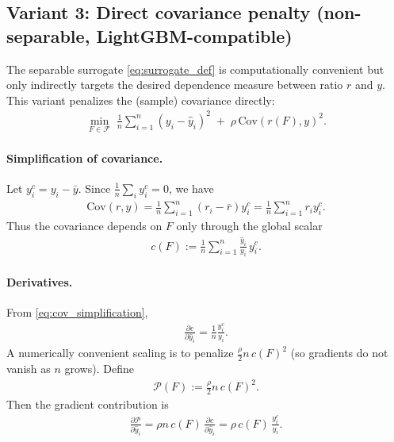 \documentclass[11pt]{article}
\theoremstyle{plain}
\theoremstyle{definition}
\newcommand{\1}{\mathbf{1}}
\begin{document}
\subsection{Variant 3: Direct covariance penalty (non-separable, LightGBM-compatible)}
\label{subsec:direct_cov}

The separable surrogate \eqref{eq:surrogate_def} is computationally convenient but only indirectly targets the desired dependence measure between ratio $r$ and $y$. This variant penalizes the (sample) covariance directly:
\begin{align}
\min_{F\in\mathcal{F}}\; \frac{1}{n}\sum_{i=1}^n (y_i-\hat y_i)^2 
\; +\; \rho\, \mathrm{Cov}(r(F),y)^2.
\label{eq:direct_cov_objective}
\end{align}

\paragraph{Simplification of covariance.}
Let $y^c_i=y_i-\bar y$. Since $\frac{1}{n}\sum_i y_i^c=0$, we have
\begin{align}
\mathrm{Cov}(r,y)
= \frac{1}{n}\sum_{i=1}^n (r_i-\bar r) y_i^c
= \frac{1}{n}\sum_{i=1}^n r_i y_i^c.
\label{eq:cov_simplification}
\end{align}
Thus the covariance depends on $F$ only through the global scalar
\begin{align}
 c(F) := \frac{1}{n}\sum_{i=1}^n \frac{\hat y_i}{y_i}\, y_i^c.
\end{align}

\paragraph{Derivatives.}
From \eqref{eq:cov_simplification},
\begin{align}
\frac{\partial c}{\partial \hat y_i}
= \frac{1}{n}\frac{y_i^c}{y_i}.
\label{eq:dc_dyhat}
\end{align}
A numerically convenient scaling is to penalize $\tfrac{\rho}{2}n\,c(F)^2$ (so gradients do not vanish as $n$ grows). Define
\begin{align}
\mathcal{P}(F) := \frac{\rho}{2}n\,c(F)^2.
\end{align}
Then the gradient contribution is
\begin{align}
\frac{\partial \mathcal{P}}{\partial \hat y_i}
= \rho n\,c(F)\,\frac{\partial c}{\partial \hat y_i}
= \rho\,c(F)\,\frac{y_i^c}{y_i}.
\label{eq:grad_cov_penalty}
\end{align}
\end{document}
